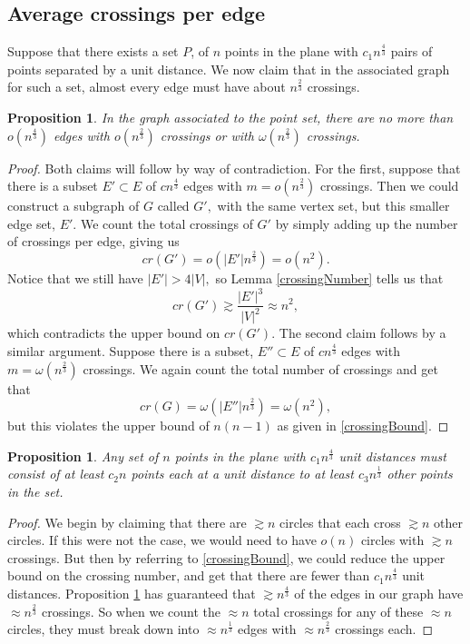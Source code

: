 \documentclass[12pt]{article}
\newtheorem{proposition}[theorem]{Proposition}
\begin{document}
\subsection{Average crossings per edge}
Suppose that there exists a set $P$, of $n$ points in the plane with $c_1n^\frac{4}{3}$ pairs of points separated by a unit distance. We now claim that in the associated graph for such a set, almost every edge must have about $n^\frac{2}{3}$ crossings.
\begin{proposition}\label{avgCrossings}
In the graph associated to the point set, there are no more than $o\left(n^\frac{4}{3}\right)$ edges with $o\left( n^\frac{2}{3}\right)$ crossings or with $\omega\left(n^\frac{2}{3}\right)$ crossings.
\end{proposition}
\begin{proof}
Both claims will follow by way of contradiction. For the first, suppose that there is a subset $E' \subset E$ of $cn^\frac{4}{3}$ edges with $m = o\left(n^\frac{2}{3}\right)$ crossings. Then we could construct a subgraph of $G$ called $G',$ with the same vertex set, but this smaller edge set, $E'.$ We count the total crossings of $G'$ by simply adding up the number of crossings per edge, giving us
$$cr(G') = o\left(|E'| n^\frac{2}{3}\right) =o \left(n^2\right).$$
Notice that we still have $|E'|>4|V|,$ so Lemma \ref{crossingNumber} tells us that
$$cr(G')\gtrsim \frac{|E'|^3}{|V|^2}\approx n^2,$$
which contradicts the upper bound on $cr(G').$
The second claim follows by a similar argument. Suppose there is a subset, $E'' \subset E$ of $cn^\frac{4}{3}$ edges with $m =\omega\left(n^\frac{2}{3}\right)$ crossings. We again count the total number of crossings and get that
$$cr(G)=\omega\left(|E''|n^\frac{2}{3}\right)=\omega\left(n^2\right),$$
but this violates the upper bound of $n(n-1)$ as given in \eqref{crossingBound}.
\end{proof}
\begin{proposition}\label{ppc}
Any set of $n$ points in the plane with $c_1 n^\frac{4}{3}$ unit distances must consist of at least $c_2 n$ points each at a unit distance to at least $c_3 n^\frac{1}{3}$ other points in the set.
\end{proposition}
\begin{proof}
We begin by claiming that there are $\gtrsim n$ circles that each cross $\gtrsim n$ other circles. If this were not the case, we would need to have $o(n)$ circles with $\gtrsim n$ crossings. But then by referring to \eqref{crossingBound}, we could reduce the upper bound on the crossing number, and get that there are fewer than $c_1 n^\frac{4}{3}$ unit distances. Proposition \ref{avgCrossings} has guaranteed that $\gtrsim n^\frac{4}{3}$ of the edges in our graph have $\approx n^\frac{2}{3}$ crossings. So when we count the $\approx n$ total crossings for any of these $\approx n$ circles, they must break down into $\approx n^\frac{1}{3}$ edges with $\approx n^\frac{2}{3}$ crossings each.
\end{proof}
\end{document}
